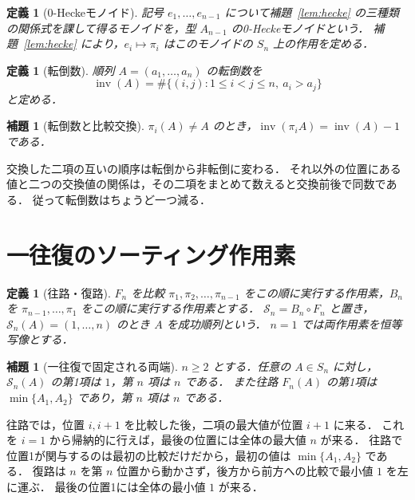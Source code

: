 \documentclass[a5paper,10pt,onecolumn]{jsarticle}
\makeatletter
\theoremstyle{mathnotetheorem}
\newtheorem{definition}[theorem]{定義}
\newtheorem{lemma}[theorem]{補題}
\renewcommand{\proofname}{証明}
\renewenvironment{proof}[1][\proofname]{%
  \par\pushQED{\qed}\normalfont\topsep4\p@\@plus2\p@\relax
  \trivlist\item[\hskip\labelsep\bfseries #1]\ignorespaces
}{\popQED\endtrivlist\@endpefalse}
\makeatother
\begin{document}
\begin{definition}[0-Heckeモノイド]
記号 $e_1,\ldots,e_{n-1}$ について補題~\ref{lem:hecke} の三種類の関係式を課して得るモノイドを，型 $A_{n-1}$ の0-Heckeモノイドという．
補題~\ref{lem:hecke} により，$e_i\mapsto\pi_i$ はこのモノイドの $S_n$ 上の作用を定める．
\end{definition}

\begin{definition}[転倒数]
順列 $A=(a_1,\ldots,a_n)$ の転倒数を
\[
 \operatorname{inv}(A)=\#\{(i,j):1\le i<j\le n,\ a_i>a_j\}
\]
と定める．
\end{definition}
\begin{lemma}[転倒数と比較交換]
$\pi_i(A)\ne A$ のとき，$\operatorname{inv}(\pi_i A)=\operatorname{inv}(A)-1$ である．
\end{lemma}
\begin{proof}
交換した二項の互いの順序は転倒から非転倒に変わる．
それ以外の位置にある値と二つの交換値の関係は，その二項をまとめて数えると交換前後で同数である．
従って転倒数はちょうど一つ減る．
\end{proof}

\section{一往復のソーティング作用素}
\begin{definition}[往路・復路]
$F_n$ を比較 $\pi_1,\pi_2,\ldots,\pi_{n-1}$ をこの順に実行する作用素，$B_n$ を $\pi_{n-1},\ldots,\pi_1$ をこの順に実行する作用素とする．
$\mathcal S_n=B_n\circ F_n$ と置き，$\mathcal S_n(A)=(1,\ldots,n)$ のとき $A$ を成功順列という．
$n=1$ では両作用素を恒等写像とする．
\end{definition}

\begin{lemma}[一往復で固定される両端]\label{lem:extremes}
$n\ge2$ とする．任意の $A\in S_n$ に対し，$\mathcal S_n(A)$ の第1項は $1$，第 $n$ 項は $n$ である．
また往路 $F_n(A)$ の第1項は $\min\{A_1,A_2\}$ であり，第 $n$ 項は $n$ である．
\end{lemma}
\begin{proof}
往路では，位置 $i,i+1$ を比較した後，二項の最大値が位置 $i+1$ に来る．
これを $i=1$ から帰納的に行えば，最後の位置には全体の最大値 $n$ が来る．
往路で位置1が関与するのは最初の比較だけだから，最初の値は $\min\{A_1,A_2\}$ である．
復路は $n$ を第 $n$ 位置から動かさず，後方から前方への比較で最小値 $1$ を左に運ぶ．
最後の位置1には全体の最小値 $1$ が来る．
\end{proof}
\end{document}
